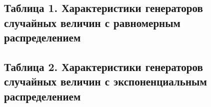 \documentclass[listings]{labreport}
\begin{document}
\subsection*{Таблица 1. Характеристики генераторов случайных величин с равномерным распределением}
\begin{adjustbox}{width=\columnwidth,center}

\end{adjustbox}

\subsection*{Таблица 2. Характеристики генераторов случайных величин с экспоненциальным распределением}
\begin{adjustbox}{width=\columnwidth,center}

\end{adjustbox}
\end{document}
